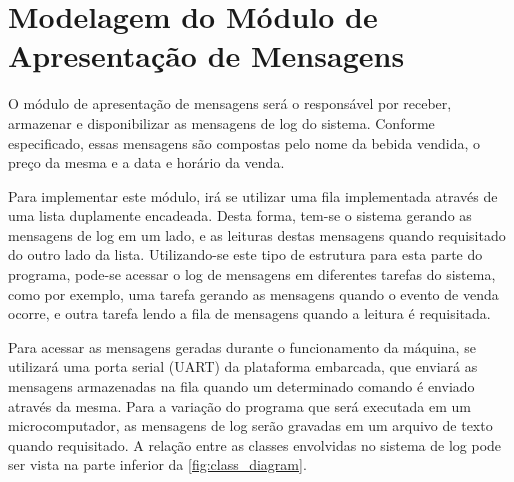 %
%
%
%
%

%
%
%
%
%

\section{Modelagem do Módulo de Apresentação de Mensagens} \label{sec:messages}

O módulo de apresentação de mensagens será o responsável por receber, armazenar e disponibilizar as mensagens de log do sistema. Conforme especificado, essas mensagens são compostas pelo nome da bebida vendida, o preço da mesma e a data e horário da venda.

Para implementar este módulo, irá se utilizar uma fila implementada através de uma lista duplamente encadeada. Desta forma, tem-se o sistema gerando as mensagens de log em um lado, e as leituras destas mensagens quando requisitado do outro lado da lista. Utilizando-se este tipo de estrutura para esta parte do programa, pode-se acessar o log de mensagens em diferentes tarefas do sistema, como por exemplo, uma tarefa gerando as mensagens quando o evento de venda ocorre, e outra tarefa lendo a fila de mensagens quando a leitura é requisitada.

Para acessar as mensagens geradas durante o funcionamento da máquina, se utilizará uma porta serial (UART) da plataforma embarcada, que enviará as mensagens armazenadas na fila quando um determinado comando é enviado através da mesma. Para a variação do programa que será executada em um microcomputador, as mensagens de log serão gravadas em um arquivo de texto quando requisitado. A relação entre as classes envolvidas no sistema de log pode ser vista na parte inferior da \autoref{fig:class_diagram}.
